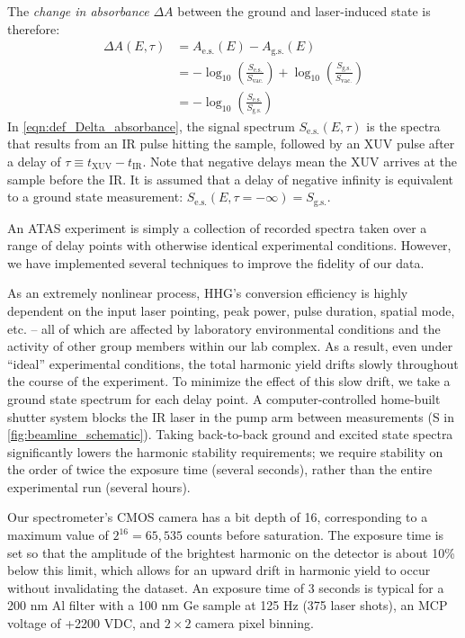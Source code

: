 The \textit{change in absorbance} $\Delta A$ between the ground and laser-induced state is therefore:
\begin{equation}
\begin{aligned}
\Delta A(E,\tau) &= A_{\textrm{e.s.}}(E) - A_{\textrm{g.s.}}(E)\\
&= - \log_{10} \left( \frac{S_{\textrm{e.s.}}}{S_{\textrm{vac.}}} \right) + \log_{10} \left( \frac{S_{\textrm{g.s.}}}{S_{\textrm{vac.}}} \right)\\
&= - \log_{10} \left( \frac{S_{\textrm{e.s.}}}{S_{\textrm{g.s.}}} \right)
\end{aligned}
\label{eqn:def_Delta_absorbance}
\end{equation}
In \cref{eqn:def_Delta_absorbance}, the signal spectrum $S_{\textrm{e.s.}}(E, \tau)$ is the spectra that results from an IR pulse hitting the sample, followed by an XUV pulse after a delay of $\tau \equiv t_{\textrm{XUV}} - t_{\textrm{IR}}$. Note that negative delays mean the XUV arrives at the sample before the IR. It is assumed that a delay of negative infinity is equivalent to a ground state measurement: $S_{\textrm{e.s.}}(E, \tau = - \infty) = S_{\textrm{g.s.}}$.

An ATAS experiment is simply a collection of recorded spectra taken over a range of delay points with otherwise identical experimental conditions. However, we have implemented several techniques to improve the fidelity of our data.

As an extremely nonlinear process, HHG's conversion efficiency is highly dependent on the input laser pointing, peak power, pulse duration, spatial mode, etc. -- all of which are affected by laboratory environmental conditions and the activity of other group members within our lab complex. As a result, even under ``ideal'' experimental conditions, the total harmonic yield drifts slowly throughout the course of the experiment. To minimize the effect of this slow drift, we take a ground state spectrum for each delay point. A computer-controlled home-built shutter system blocks the IR laser in the pump arm between measurements (S in \cref{fig:beamline_schematic}). Taking back-to-back ground and excited state spectra significantly lowers the harmonic stability requirements; we require stability on the order of twice the exposure time (several seconds), rather than the entire experimental run (several hours).

Our spectrometer's CMOS camera has a bit depth of 16, corresponding to a maximum value of $2^{16} = 65,535$ counts before saturation. The exposure time is set so that the amplitude of the brightest harmonic on the detector is about 10\% below this limit, which allows for an upward drift in harmonic yield to occur without invalidating the dataset. An exposure time of 3 seconds is typical for a 200 nm Al filter with a 100 nm Ge sample at 125 Hz (375 laser shots), an MCP voltage of +2200 VDC, and $2 \times 2$ camera pixel binning.

